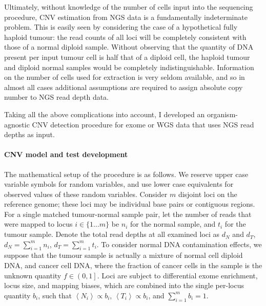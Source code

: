 \documentclass[dissertation.tex]{subfiles}
\begin{document}
Ultimately, without knowledge of the number of cells input into the sequencing procedure, \gls{CNV} estimation from \gls{NGS} data is a fundamentally indeterminate problem.  This is easily seen by considering the case of a hypothetical fully haploid tumour: the read counts of all loci will be completely consistent with those of a normal diploid sample.  Without observing that the quantity of DNA present per input tumour cell is half that of a diploid cell, the haploid tumour and diploid normal samples would be completely indistinguishable.  Information on the number of cells used for extraction is very seldom available, and so in almost all cases additional assumptions are required to assign absolute copy number to \gls{NGS} read depth data.

Taking all the above complications into account, I developed an organism-agnostic \gls{CNV} detection procedure for exome or \gls{WGS} data that uses \gls{NGS} read depths as input.  

\paragraph{\Acrshort{CNV} model and test development}
The mathematical setup of the procedure is as follows.  We reserve upper case variable symbols for random variables, and use lower case equivalents for observed values of these random variables.  Consider $m$ disjoint loci on the reference genome; these loci may be individual base pairs or contiguous regions.  For a single matched tumour-normal sample pair, let the number of reads that were mapped to locus $i \in \{1 \dots m\}$ be $n_i$ for the normal sample, and $t_i$ for the tumour sample.  Denote the total read depths at all examined loci as $d_N$ and $d_T$, $d_N = \sum_{i=1}^{m} n_i$, $d_T = \sum_{i=1}^{m} t_i$. To consider normal DNA contamination effects, we suppose that the tumour sample is actually a mixture of normal cell diploid DNA, and cancer cell DNA, where the fraction of cancer cells in the sample is the unknown quantity $f \in \left(0, 1\right]$.  Loci are subject to differential exome enrichment, locus size, and mapping biases, which are combined into the single per-locus quantity $b_i$, such that $\left<N_i\right> \propto b_i$, $\left<T_i\right> \propto b_i$, and $\sum_{i=1}^{m} b_i = 1$.
\end{document}
